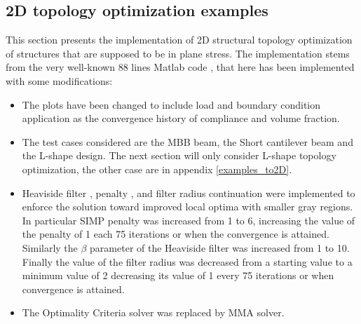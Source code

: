  \subsection{2D topology optimization examples}
This section presents the implementation of 2D structural topology optimization of structures that are supposed to be in plane stress. The implementation stems from the very well-known 88 lines Matlab code \cite{andreassen2011efficient}, that here has been implemented with some modifications:
\begin{itemize}
\item The plots have been changed to include load and boundary condition application as the convergence history of compliance and volume fraction. 
\item The test cases considered are the MBB beam, the Short cantilever beam and the L-shape design. The next section will only consider L-shape topology optimization, the other case are in appendix \ref{examples_to2D}.
\item Heaviside filter \cite{guest2004achieving,lazarov2011filters}, penalty \cite{allaire1993numerical,allaire1993topology}, and filter radius \cite{sigmund1997design,sigmund1997designb} continuation were implemented to enforce the solution toward improved local optima with smaller gray regions.
In particular SIMP penalty was increased from 1 to 6, increasing the value of the penalty of 1 each 75 iterations or when the convergence is attained.
Similarly the $\beta$ parameter of the Heaviside filter was increased from 1 to 10.  Finally the value of the filter radius was decreased from a starting value to a minimum value of 2 decreasing its value of 1 every 75 iterations or when convergence is attained.
\item The Optimality Criteria solver was replaced by MMA solver.
\end{itemize}
